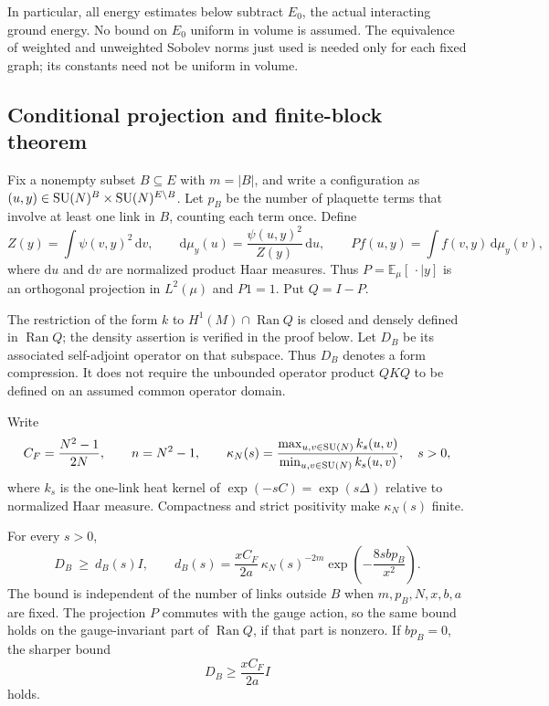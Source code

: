 In particular, all energy estimates below subtract $E_0$, the actual
interacting ground energy.  No bound on $E_0$ uniform in volume is assumed.
The equivalence of weighted and unweighted Sobolev norms just used is needed
only for each fixed graph; its constants need not be uniform in volume.

\subsection{Conditional projection and finite-block theorem}
\label{vac:block}

Fix a nonempty subset $B\subseteq E$ with $m=|B|$, and write a configuration
as $(u,y)\in\operatorname{SU}(N)^B\times\operatorname{SU}(N)^{E\setminus B}$.  Let $p_B$ be the number
of plaquette terms that involve at least one link in $B$, counting each term
once.  Define
\begin{equation}
 Z(y)=\int\psi(v,y)^2\,\mathrm dv,
 \qquad
 \mathrm d\mu_y(u)=\frac{\psi(u,y)^2}{Z(y)}\,\mathrm du,
 \qquad
 Pf(u,y)=\int f(v,y)\,\mathrm d\mu_y(v),
 \label{vac:conditional}
\end{equation}
where $\mathrm du$ and $\mathrm dv$ are normalized product Haar measures.
Thus $P=\mathbb E_\mu[\,\cdot\mid y]$ is an orthogonal projection in
$L^2(\mu)$ and $P1=1$.  Put $Q=I-P$.

The restriction of the form $k$ to
$H^1(M)\cap\operatorname{Ran}Q$ is closed and densely defined in
$\operatorname{Ran}Q$; the density assertion is verified in the proof below.
Let $D_B$ be its associated self-adjoint operator on that subspace.  Thus
$D_B$ denotes a form compression.  It does not require the unbounded
operator product $QKQ$ to be defined on an assumed common operator domain.

Write
\begin{equation}
 C_F=\frac{N^2-1}{2N},\qquad n=N^2-1,
 \qquad
 \kappa_N(s)=
 \frac{\max_{u,v\in\operatorname{SU}(N)}k_s(u,v)}
      {\min_{u,v\in\operatorname{SU}(N)}k_s(u,v)},\quad s>0,
 \label{vac:constants}
\end{equation}
where $k_s$ is the one-link heat kernel of $\exp(-sC)=\exp(s\Delta)$
relative to normalized Haar measure.  Compactness and strict positivity make
$\kappa_N(s)$ finite.

\begin{theorem}
\label{vac:finiteblock}
For every $s>0$,
\begin{equation}
 D_B\ \geq\ d_B(s)I,
 \qquad
 d_B(s)=\frac{xC_F}{2a}\,
       \kappa_N(s)^{-2m}
       \exp\!\left(-\frac{8sbp_B}{x^2}\right).
 \label{vac:heatbound}
\end{equation}
The bound is independent of the number of links outside $B$ when
$m,p_B,N,x,b,a$ are fixed.  The projection $P$ commutes with the gauge
action, so the same bound holds on the gauge-invariant part of
$\operatorname{Ran}Q$, if that part is nonzero.  If $bp_B=0$, the sharper
bound
\begin{equation}
 D_B\geq\frac{xC_F}{2a}I
 \label{vac:freebound}
\end{equation}
holds.
\end{theorem}

